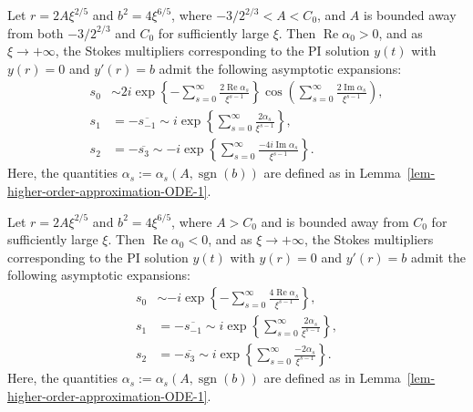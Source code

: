 \documentclass[12pt]{article}
\theoremstyle{plain}
\newtheorem{theorem}{\hskip\parindent Theorem}
\theoremstyle{definition}
\numberwithin{equation}{section}
\renewcommand\Re{\operatorname{Re}}
\renewcommand\Im{\operatorname{Im}}
\newcommand\sgn{\operatorname{sgn}}
\begin{document}
\begin{theorem}\label{Thm-stokes-case-II}
Let $r = 2A\xi^{2/5}$ and $b^2 = 4\xi^{6/5}$, where $-3/2^{2/3} < A < C_{0}$, and $A$ is bounded away from both $-3/2^{2/3}$ and $C_{0}$ for sufficiently large $\xi$. Then $\Re \alpha_{0} > 0$, and as $\xi \to +\infty$, the Stokes multipliers corresponding to the PI solution $y(t)$ with $y(r) = 0$ and $y'(r) = b$ admit the following asymptotic expansions:
\begin{equation}\label{eq-stokes-full-asymptotic-case-II}
\begin{aligned}
s_{0} &\sim 2i \exp\left\{ -\sum_{s=0}^{\infty} \frac{2\Re \alpha_{s}}{\xi^{s-1}} \right\}
\cos\left( \sum_{s=0}^{\infty} \frac{2\Im \alpha_{s}}{\xi^{s-1}} \right), \\
s_{1} &= -\overline{s_{-1}} \sim i \exp\left\{ \sum_{s=0}^{\infty} \frac{2\alpha_{s}}{\xi^{s-1}} \right\}, \\
s_{2} &= -\overline{s_{3}} \sim -i \exp\left\{ \sum_{s=0}^{\infty} \frac{-4i\Im \alpha_{s}}{\xi^{s-1}} \right\}.
\end{aligned}
\end{equation}
Here, the quantities $\alpha_{s} := \alpha_{s}(A, \sgn(b))$ are defined as in Lemma~\ref{lem-higher-order-approximation-ODE-1}.
\end{theorem}


\begin{theorem}\label{Thm-stokes-case-III}
Let $r = 2A\xi^{2/5}$ and $b^2 = 4\xi^{6/5}$, where $A > C_{0}$ and is bounded away from $C_{0}$ for sufficiently large $\xi$. Then $\Re \alpha_{0} < 0$, and as $\xi \to +\infty$, the Stokes multipliers corresponding to the PI solution $y(t)$ with $y(r) = 0$ and $y'(r) = b$ admit the following asymptotic expansions:
\begin{equation}\label{eq-stokes-full-asymptotic-case-III}
\begin{aligned}
s_{0}&\sim -i\exp\left\{-\sum\limits_{s=0}^{\infty}\frac{4\Re\alpha_{s}}{\xi^{s-1}}\right\},\\
s_{1}&=-\overline{s_{-1}}\sim i\exp\left\{\sum\limits_{s=0}^{\infty}\frac{2\alpha_{s}}{\xi^{s-1}}\right\},\\
s_{2}&=-\overline{s_{3}}\sim i\exp\left\{\sum\limits_{s=0}^{\infty}\frac{-2\alpha_{s}}{\xi^{s-1}}\right\}.
\end{aligned}
\end{equation}
Here, the quantities $\alpha_{s} := \alpha_{s}(A, \sgn(b))$ are defined as in Lemma~\ref{lem-higher-order-approximation-ODE-1}.
\end{theorem}
\end{document}
